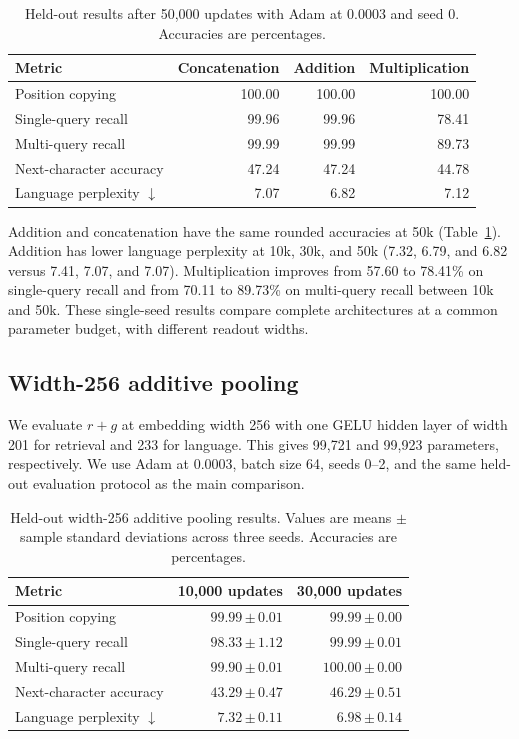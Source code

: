 \documentclass[11pt]{article}
\newcommand{\sd}[2]{#1\,{\scriptstyle\pm\,#2}}
\begin{document}
\begin{table}[htbp]
\centering\small
\caption{Held-out results after 50,000 updates with Adam at 0.0003 and seed 0. Accuracies are percentages.}
\label{tab:wide-pooling-combinations}
\begin{tabular}{lrrr}
\toprule
Metric & Concatenation & Addition & Multiplication\\
\midrule
Position copying & 100.00 & 100.00 & 100.00\\
Single-query recall & 99.96 & 99.96 & 78.41\\
Multi-query recall & 99.99 & 99.99 & 89.73\\
Next-character accuracy & 47.24 & 47.24 & 44.78\\
Language perplexity \(\downarrow\) & 7.07 & 6.82 & 7.12\\
\bottomrule
\end{tabular}
\end{table}

Addition and concatenation have the same rounded accuracies at 50k (Table~\ref{tab:wide-pooling-combinations}). Addition has lower language perplexity at 10k, 30k, and 50k (7.32, 6.79, and 6.82 versus 7.41, 7.07, and 7.07). Multiplication improves from 57.60 to 78.41\% on single-query recall and from 70.11 to 89.73\% on multi-query recall between 10k and 50k. These single-seed results compare complete architectures at a common parameter budget, with different readout widths.

\subsection{Width-256 additive pooling}
We evaluate \(r+g\) at embedding width 256 with one GELU hidden layer of width
201 for retrieval and 233 for language. This gives 99,721 and 99,923 parameters,
respectively. We use Adam at 0.0003, batch size 64, seeds 0--2, and the same
held-out evaluation protocol as the main comparison.

\begin{table}[htbp]
\centering\small
\caption{Held-out width-256 additive pooling results. Values are means
$\pm$ sample standard deviations across three seeds. Accuracies are percentages.}
\label{tab:additive-pooling-256}
\begin{tabular}{lrr}
\toprule
Metric & 10,000 updates & 30,000 updates\\
\midrule
Position copying & \(\sd{99.99}{0.01}\) & \(\sd{99.99}{0.00}\)\\
Single-query recall & \(\sd{98.33}{1.12}\) & \(\sd{99.99}{0.01}\)\\
Multi-query recall & \(\sd{99.90}{0.01}\) & \(\sd{100.00}{0.00}\)\\
Next-character accuracy & \(\sd{43.29}{0.47}\) & \(\sd{46.29}{0.51}\)\\
Language perplexity \(\downarrow\) & \(\sd{7.32}{0.11}\) & \(\sd{6.98}{0.14}\)\\
\bottomrule
\end{tabular}
\end{table}
\end{document}
